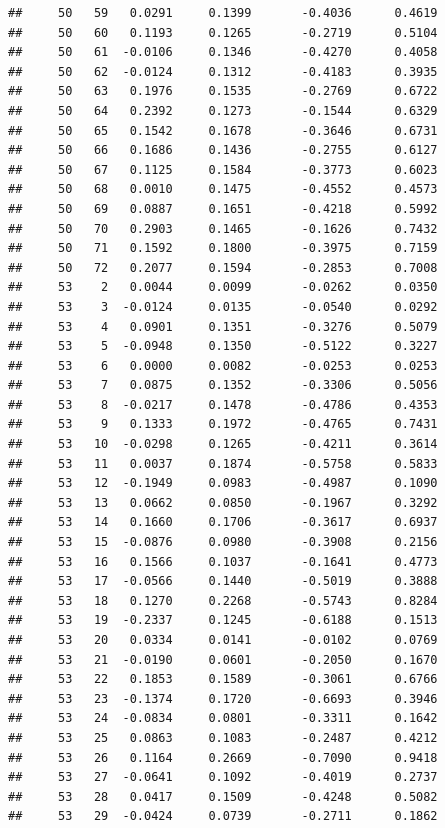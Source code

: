 \documentclass[
]{article}
\begin{document}
\begin{verbatim}
##     50   59   0.0291     0.1399       -0.4036      0.4619  
##     50   60   0.1193     0.1265       -0.2719      0.5104  
##     50   61  -0.0106     0.1346       -0.4270      0.4058  
##     50   62  -0.0124     0.1312       -0.4183      0.3935  
##     50   63   0.1976     0.1535       -0.2769      0.6722  
##     50   64   0.2392     0.1273       -0.1544      0.6329  
##     50   65   0.1542     0.1678       -0.3646      0.6731  
##     50   66   0.1686     0.1436       -0.2755      0.6127  
##     50   67   0.1125     0.1584       -0.3773      0.6023  
##     50   68   0.0010     0.1475       -0.4552      0.4573  
##     50   69   0.0887     0.1651       -0.4218      0.5992  
##     50   70   0.2903     0.1465       -0.1626      0.7432  
##     50   71   0.1592     0.1800       -0.3975      0.7159  
##     50   72   0.2077     0.1594       -0.2853      0.7008  
##     53    2   0.0044     0.0099       -0.0262      0.0350  
##     53    3  -0.0124     0.0135       -0.0540      0.0292  
##     53    4   0.0901     0.1351       -0.3276      0.5079  
##     53    5  -0.0948     0.1350       -0.5122      0.3227  
##     53    6   0.0000     0.0082       -0.0253      0.0253  
##     53    7   0.0875     0.1352       -0.3306      0.5056  
##     53    8  -0.0217     0.1478       -0.4786      0.4353  
##     53    9   0.1333     0.1972       -0.4765      0.7431  
##     53   10  -0.0298     0.1265       -0.4211      0.3614  
##     53   11   0.0037     0.1874       -0.5758      0.5833  
##     53   12  -0.1949     0.0983       -0.4987      0.1090  
##     53   13   0.0662     0.0850       -0.1967      0.3292  
##     53   14   0.1660     0.1706       -0.3617      0.6937  
##     53   15  -0.0876     0.0980       -0.3908      0.2156  
##     53   16   0.1566     0.1037       -0.1641      0.4773  
##     53   17  -0.0566     0.1440       -0.5019      0.3888  
##     53   18   0.1270     0.2268       -0.5743      0.8284  
##     53   19  -0.2337     0.1245       -0.6188      0.1513  
##     53   20   0.0334     0.0141       -0.0102      0.0769  
##     53   21  -0.0190     0.0601       -0.2050      0.1670  
##     53   22   0.1853     0.1589       -0.3061      0.6766  
##     53   23  -0.1374     0.1720       -0.6693      0.3946  
##     53   24  -0.0834     0.0801       -0.3311      0.1642  
##     53   25   0.0863     0.1083       -0.2487      0.4212  
##     53   26   0.1164     0.2669       -0.7090      0.9418  
##     53   27  -0.0641     0.1092       -0.4019      0.2737  
##     53   28   0.0417     0.1509       -0.4248      0.5082  
##     53   29  -0.0424     0.0739       -0.2711      0.1862  

\end{verbatim}
\end{document}
